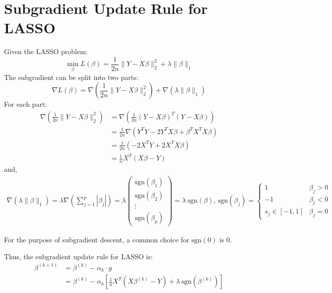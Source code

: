 \documentclass[11pt, a4paper, oneside]{memoir}
\begin{document}
\newpage
\section{Subgradient Update Rule for LASSO}
Given the LASSO problem:
\[ \min_{\beta} L(\beta) = \frac{1}{2n} \|Y - X\beta\|_2^2 + \lambda \|\beta\|_1 \]
The subgradient can be split into two parts:
\[ \nabla L(\beta) = \nabla \left( \frac{1}{2n} \|Y - X\beta\|_2^2 \right) + \nabla \left( \lambda \|\beta\|_1 \right) \]
For each part:
\begin{align*}
    \nabla \left( \frac{1}{2n} \|Y - X\beta\|_2^2 \right) & = \nabla \left( \frac{1}{2n} (Y - X\beta)^T (Y - X\beta) \right)               \\
                                                          & = \frac{1}{2n} \nabla \left( Y^T Y - 2Y^T X\beta + \beta^T X^T X \beta \right) \\
                                                          & = \frac{1}{2n} (-2X^T Y + 2X^T X\beta)                                         \\
                                                          & = \frac{1}{n} X^T (X\beta - Y)
\end{align*}
and,
\begin{align*}
    \nabla \left( \lambda \|\beta\|_1 \right) = \lambda \nabla \left( \sum_{j=1}^{p} |\beta_j| \right)
    = \lambda \begin{pmatrix} \text{sgn}(\beta_1) \\ \text{sgn}(\beta_2) \\ \vdots \\ \text{sgn}(\beta_p) \end{pmatrix}
    = \lambda ~\text{sgn}(\beta)
    \text{, } \text{sgn}(\beta_j) = \begin{cases} 1 & \beta_j > 0 \\ -1 & \beta_j < 0 \\ s_j \in [-1, 1] & \beta_j = 0 \end{cases}
\end{align*}

For the purpose of subgradient descent, a common choice for $\text{sgn}(0)$ is $0$.

Thus, the subgradient update rule for LASSO is:
\begin{align*}
    \beta^{(k+1)} & = \beta^{(k)} - \alpha_k \cdot g                                                                              \\
                  & = \beta^{(k)} - \alpha_k \left[ \frac{1}{n} X^T (X\beta^{(k)} - Y) + \lambda ~\text{sgn}(\beta^{(k)}) \right]
\end{align*}
\end{document}
